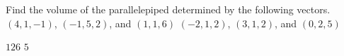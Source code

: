 
\begin{Exercise}[
name={},
title={}, 
difficulty=0,
origin={\cite{SM}}]
Find the volume of the parallelepiped determined by the following vectors.
\Question $(4,1,-1)$, $(-1,5,2)$, and $(1,1,6)$
\Question $(-2,1,2)$, $(3,1,2)$, and $(0,2,5)$
\end{Exercise}

\begin{Answer}
\Question $126$
\Question $5$
\end{Answer}
